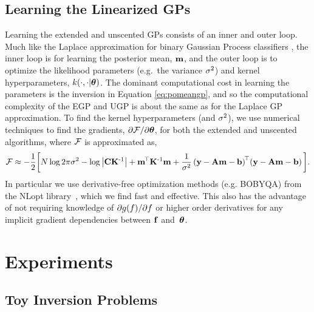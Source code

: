 \documentclass{article} %
\begin{document}
\subsection{Learning the Linearized GPs}

Learning the extended and unscented GPs consists of  an inner and outer loop.
Much like the Laplace approximation for binary Gaussian Process classifiers
\cite{Rasmussen2006}, the inner loop is for learning the posterior mean,
$\mathbf{m}$, and the outer loop is to optimize the likelihood parameters
(e.g.~the variance $\sigma^2$) and kernel hyperparameters,
$k\!\left({{\cdot}, {\cdot|\boldsymbol\theta}}\right)$. The dominant computational cost in learning
the parameters is the inversion in Equation \eqref{eq:pomeangp}, and so the
computational complexity of the EGP and UGP is about the same as for the
Laplace GP approximation.
%
To find the kernel hyperparameters (and $\sigma^2$), we use numerical techniques
to find the gradients, $\partial\mathcal{F}/\partial\boldsymbol\theta$, for both the extended
and unscented algorithms, where $\mathcal{F}$ is approximated as,
\begin{equation}
    \mathcal{F} \approx - \frac{1}{2} \bigg[
    N\log{2\pi\ensuremath{\sigma^2}} - \log\left|{\mathbf{C}\mathbf{K}^{\text{-}1}}\right|
    + \mathbf{m}^{\!\top}\mathbf{K}^{\text{-}1} \mathbf{m}
    + \frac{1}{\sigma^2}
        \left({\mathbf{y} - \mathbf{A}\mathbf{m} - \mathbf{b}}\right)^{\!\top}\!
        \left({\mathbf{y} - \mathbf{A}\mathbf{m} - \mathbf{b}}\right)
    \bigg].
    \label{eq:fengygp}
\end{equation}
In particular we use derivative-free optimization methods (e.g. BOBYQA) from
the NLopt library~\cite{JohnsonNLOPT}, which we find fast and effective. This
also has the advantage of not requiring knowledge of
$\partial g\!\left({{f}}\right)\!/\partial f$ or higher order derivatives for
any implicit gradient dependencies between $\mathbf{f}$ and~$\boldsymbol\theta$. 


\section{Experiments}
\label{sec:experiments}
%
%
%
%
\subsection{Toy Inversion Problems}
\label{sec:exptoy}
\end{document}
